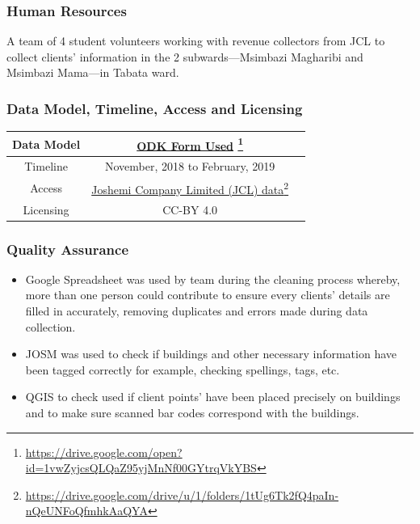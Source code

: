 \documentclass[a4paper,12pt,twoside]{article}
\begin{document}
\subsubsection{Human Resources}
A team of 4 student volunteers working with revenue collectors from JCL to collect clients’ information in the 2 subwards---Msimbazi Magharibi and Msimbazi Mama---in Tabata ward.

\subsubsection{Data Model, Timeline, Access and Licensing}
\begin{center}
\begin{tabular}{|c|c|c|}  
 \hline
Data Model &
      \href{https://drive.google.com/open?id=1vwZyjcsQLQaZ95yjMnNf00GYtrqVkYBS}{ODK Form Used} \footnote{\url{https://drive.google.com/open?id=1vwZyjcsQLQaZ95yjMnNf00GYtrqVkYBS}} \\
 \hline
  Timeline  &  November, 2018 to February, 2019 \\
\hline  
 Access  & 
   \href{https://drive.google.com/drive/u/1/folders/1tUg6Tk2fQ4paIn-nQeUNFoQfmhkAaQYA}{Joshemi Company Limited (JCL) data}\footnote{\url{https://drive.google.com/drive/u/1/folders/1tUg6Tk2fQ4paIn-nQeUNFoQfmhkAaQYA}} \\
   
\hline 
    Licensing & CC-BY 4.0 \\
\hline
\end{tabular}
\end{center}

\subsubsection{Quality Assurance}
\begin{itemize}
    \item Google Spreadsheet was used by team during the cleaning process whereby, more than one person could contribute to ensure every clients’ details are filled in accurately, removing duplicates and errors made during data collection.
    \item JOSM was used to check if buildings and other necessary information have been tagged correctly for example, checking spellings, tags, etc.
    \item QGIS to check used if client points' have been placed precisely on buildings and to make sure scanned bar codes correspond with the buildings.
\end{itemize}
\end{document}
